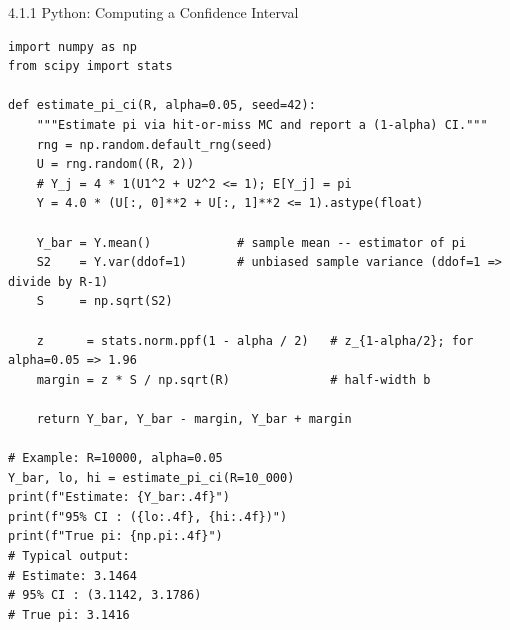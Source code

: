 \documentclass[aspectratio=169,10pt]{beamer}
\begin{document}
\begin{frame}[fragile]{4.1.1 Python: Computing a Confidence Interval}
\begin{lstlisting}[style=python]
import numpy as np
from scipy import stats

def estimate_pi_ci(R, alpha=0.05, seed=42):
    """Estimate pi via hit-or-miss MC and report a (1-alpha) CI."""
    rng = np.random.default_rng(seed)
    U = rng.random((R, 2))
    # Y_j = 4 * 1(U1^2 + U2^2 <= 1); E[Y_j] = pi
    Y = 4.0 * (U[:, 0]**2 + U[:, 1]**2 <= 1).astype(float)

    Y_bar = Y.mean()            # sample mean -- estimator of pi
    S2    = Y.var(ddof=1)       # unbiased sample variance (ddof=1 => divide by R-1)
    S     = np.sqrt(S2)

    z      = stats.norm.ppf(1 - alpha / 2)   # z_{1-alpha/2}; for alpha=0.05 => 1.96
    margin = z * S / np.sqrt(R)              # half-width b

    return Y_bar, Y_bar - margin, Y_bar + margin

# Example: R=10000, alpha=0.05
Y_bar, lo, hi = estimate_pi_ci(R=10_000)
print(f"Estimate: {Y_bar:.4f}")
print(f"95% CI : ({lo:.4f}, {hi:.4f})")
print(f"True pi: {np.pi:.4f}")
# Typical output:
# Estimate: 3.1464
# 95% CI : (3.1142, 3.1786)
# True pi: 3.1416
\end{lstlisting}
\end{frame}

\end{document}
